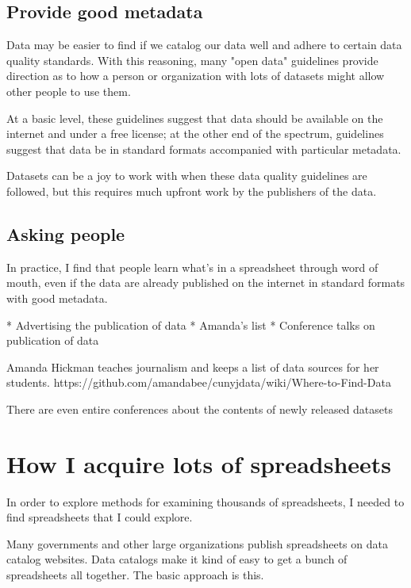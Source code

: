 \documentclass{acm_proc_article-sp}
\begin{document}
\subsection{Provide good metadata} \label{guidelines}
Data may be easier to find if we catalog our data well and adhere to
certain data quality standards. With this reasoning,
many "open data" guidelines provide direction as to how a person
or organization with lots of datasets might allow other people
to use them.
\cite{open-data-census,fivestars,sunlight,sebastopol,odi}

At a basic level, these guidelines suggest that data should
be available on the internet and under a free license; at the other
end of the spectrum, guidelines suggest that data be in standard
formats accompanied with particular metadata.

Datasets can be a joy to work with when these data quality guidelines
are followed, but this requires much upfront work by the publishers
of the data.

\subsection{Asking people}
In practice, I find that people learn what's in a spreadsheet through word
of mouth, even if the data are already published on the internet in standard
formats with good metadata.

* Advertising the publication of data
* Amanda's list
* Conference talks on publication of data

Amanda Hickman teaches journalism and keeps a list of data sources for her
students. \cite{amanda}
https://github.com/amandabee/cunyjdata/wiki/Where-to-Find-Data

There are even entire conferences about the contents of newly released datasets
\cite{apdu}

\section{How I acquire lots of spreadsheets} \label{acquire}
In order to explore methods for examining thousands of spreadsheets,
I needed to find spreadsheets that I could explore.

Many governments and other large organizations publish spreadsheets on
data catalog websites.
Data catalogs make it kind of easy to get a bunch of spreadsheets all together.
The basic approach is this.
\end{document}
